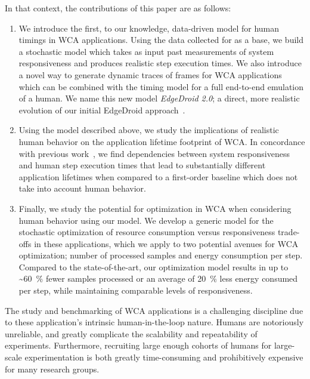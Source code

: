 In that context, the contributions of this paper are as follows:
\begin{enumerate}
    \item\label{item:contrib:model} We introduce the first, to our knowledge, data-driven model for human timings in \ac{WCA} applications.
    Using the data collected for \textcite{olguinmunoz:impact2021} as a base, we build a stochastic model which takes as input past measurements of system responsiveness and produces realistic step execution times.
    We also introduce a novel way to generate dynamic traces of frames for \ac{WCA} applications which can be combined with the timing model for a full end-to-end emulation of a human.
    We name this new model \emph{EdgeDroid 2.0}; a direct, more realistic evolution of our initial EdgeDroid approach~\cite{olguin2018scaling,olguin2019edgedroid}.
    \item\label{item:contrib:footprint} Using the model described above, we study the implications of realistic human behavior on the application lifetime footprint of \ac{WCA}.
    In concordance with previous work~\cite{olguinmunoz:impact2021}, we find dependencies between system responsiveness and human step execution times that lead to substantially different application lifetimes when compared to a first-order baseline which does not take into account human behavior.
    \item\label{item:contrib:optimization} Finally, we study the potential for optimization in \ac{WCA} when considering human behavior using our model.
    We develop a generic model for the stochastic optimization of resource consumption versus responsiveness trade-offs in these applications, which we apply to two potential avenues for \ac{WCA} optimization; number of processed samples and energy consumption per step.
    Compared to the state-of-the-art, our optimization model results in up to \textasciitilde\SI{60}{\percent} fewer samples processed or an average of \SI{20}{\percent} less energy consumed per step, while maintaining comparable levels of responsiveness.
\end{enumerate}

The study and benchmarking of \ac{WCA} applications is a challenging discipline due to these application's intrinsic human-in-the-loop nature.
Humans are notoriously unreliable, and greatly complicate the scalability and repeatability of experiments.
Furthermore, recruiting large enough cohorts of humans for large-scale experimentation is both greatly time-consuming and prohibitively expensive for many research groups.


